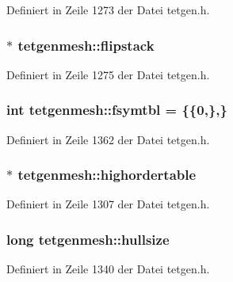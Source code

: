 Definiert in Zeile 1273 der Datei tetgen.\-h.

\hypertarget{classtetgenmesh_a141b43fe601c5260cbaba0c7a6a17d9c}{
\subsubsection[{flipstack}]{$\ast$ tetgenmesh\-::flipstack}}\label{classtetgenmesh_a141b43fe601c5260cbaba0c7a6a17d9c}


Definiert in Zeile 1275 der Datei tetgen.\-h.

\hypertarget{classtetgenmesh_ae98d2426c6fc6665cb96dcfa9a5df790}{
\subsubsection[{fsymtbl}]{\setlength{\rightskip}{0pt plus 5cm}int tetgenmesh\-::fsymtbl = \{\{0,\},\}\hspace{0.3cm}{\ttfamily [static]}}}\label{classtetgenmesh_ae98d2426c6fc6665cb96dcfa9a5df790}


Definiert in Zeile 1362 der Datei tetgen.\-h.

\hypertarget{classtetgenmesh_a0b9050e5833840e66115d4ebf85f88a3}{
\subsubsection[{highordertable}]{$\ast$ tetgenmesh\-::highordertable}}\label{classtetgenmesh_a0b9050e5833840e66115d4ebf85f88a3}


Definiert in Zeile 1307 der Datei tetgen.\-h.

\hypertarget{classtetgenmesh_a8268168f7f6fdb805a24443fc6ed1bd0}{
\subsubsection[{hullsize}]{\setlength{\rightskip}{0pt plus 5cm}long tetgenmesh\-::hullsize}}\label{classtetgenmesh_a8268168f7f6fdb805a24443fc6ed1bd0}


Definiert in Zeile 1340 der Datei tetgen.\-h.

